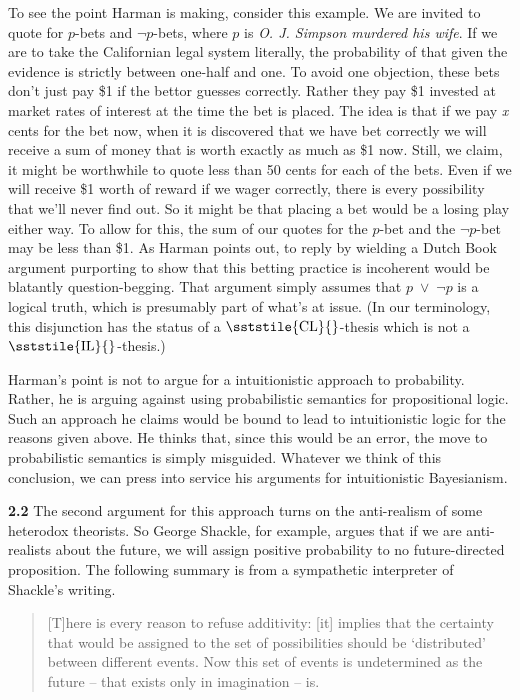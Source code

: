 To see the point Harman is making, consider this example. We are invited to quote for \(p\)\nobreakdash-bets and ${\lnot}$\(p\)\nobreakdash-bets, where \(p\) is \textit{O. J. Simpson murdered his wife}. If we are to take the Californian legal system literally, the probability of that given the evidence is strictly between one-half and one. To avoid one objection, these bets don't just pay \$1 if the bettor guesses correctly. Rather they pay \$1 invested at market rates of interest at the time the bet is placed. The idea is that if we pay \textit{x} cents for the bet now, when it is discovered that we have bet correctly we will receive a sum of money that is worth exactly as much as \$1 now. Still, we claim, it might be worthwhile to quote less than 50 cents for each of the bets. Even if we will receive \$1 worth of reward if we wager correctly, there is every possibility that we'll never find out. So it might be that placing a bet would be a losing play either way. To allow for this, the sum of our quotes for the \(p\)\nobreakdash-bet and the ${\lnot}$\(p\)\nobreakdash-bet may be less than \$1. As Harman points out, to reply by wielding a Dutch Book argument purporting to show that this betting practice is incoherent would be blatantly question-begging. That argument simply assumes that \(p\)~${\vee}$~${\lnot}$\(p\) is a logical truth, which is presumably part of what's at issue. (In our terminology, this disjunction has the status of a {\small \(\sststile{\mathrm{CL}}{}\)}{}-thesis which is not a {\small \(\sststile{\mathrm{IL}}{}\)}{}-thesis.)

Harman's point is not to argue for a intuitionistic approach to probability. Rather, he is arguing against using probabilistic semantics for propositional logic. Such an approach he claims would be bound to lead to intuitionistic logic for the reasons given above. He thinks that, since this would be an error, the move to probabilistic semantics is simply misguided. Whatever we think of this conclusion, we can press into service his arguments for intuitionistic Bayesianism.

\textbf{2.2} The second argument for this approach turns on the anti-realism of some heterodox theorists. So George Shackle, for example, argues that if we are anti-realists about the future, we will assign positive probability to no future-directed proposition. The following summary is from a sympathetic interpreter of Shackle's writing.

\begin{quote}
[T]here is every reason to refuse additivity: [it] implies that the certainty that would be assigned to the set of possibilities should be `distributed' between different events. Now this set of events is undetermined as the future -- that exists only in imagination -- is. \cite[171]{Ponsonnet1996}
\end{quote}

